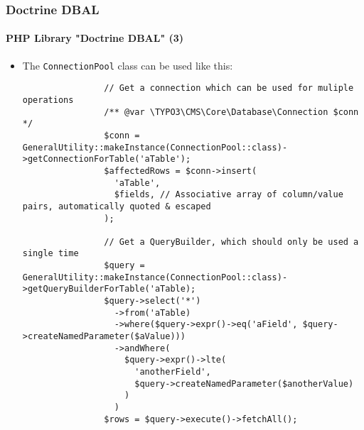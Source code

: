 \begin{frame}[fragile]
	\frametitle{Doctrine DBAL}
	\framesubtitle{PHP Library "Doctrine DBAL" (3)}

	\lstset{basicstyle=\tiny\ttfamily}

	\begin{itemize}

		\item The \texttt{ConnectionPool} class can be used like this:
			\begin{lstlisting}
				// Get a connection which can be used for muliple operations
				/** @var \TYPO3\CMS\Core\Database\Connection $conn */
				$conn = GeneralUtility::makeInstance(ConnectionPool::class)->getConnectionForTable('aTable');
				$affectedRows = $conn->insert(
				  'aTable',
				  $fields, // Associative array of column/value pairs, automatically quoted & escaped
				);

				// Get a QueryBuilder, which should only be used a single time
				$query = GeneralUtility::makeInstance(ConnectionPool::class)->getQueryBuilderForTable('aTable);
				$query->select('*')
				  ->from('aTable)
				  ->where($query->expr()->eq('aField', $query->createNamedParameter($aValue)))
				  ->andWhere(
					$query->expr()->lte(
					  'anotherField',
					  $query->createNamedParameter($anotherValue)
					)
				  )
				$rows = $query->execute()->fetchAll();
			\end{lstlisting}
	\end{itemize}

\end{frame}



